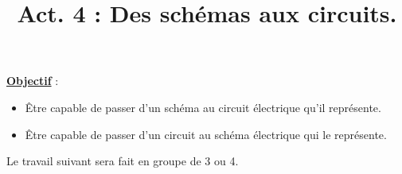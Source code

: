 \documentclass[11pt]{article}
\newcommand{\titreActivite}{Act. 4 : Des schémas aux circuits.} %
\newcommand{\objectif}{ 	
	
	\begin{itemize}
		\item Être capable de passer d'un schéma au circuit électrique qu'il représente.
		\item Être capable de passer d'un circuit au schéma électrique qui le représente.
	\end{itemize}
} %
\newcommand{\contexte}{ 

}
\newcommand{\resumeContexte}{
	}
\begin{document}
\date{}
\title{\titreActivite}
\maketitle %


\underline{\textbf{Objectif}} :  \vspace{2pt}
\objectif

\vspace{-8pt}



\textbf{\resumeContexte}
\vspace{-12pt}


Le travail suivant sera fait en groupe de 3 ou 4.
\end{document}
